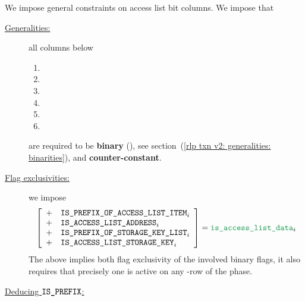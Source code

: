 We impose general constraints on access list bit columns.
We impose that
\begin{description}
    \item[\underline{Generalities:}]
	all columns below
	\begin{multicols}{2}
	    \begin{enumerate}
		\item \rlpTxnSharedColumnIsPrefix
		\item \rlpTxnSharedColumnIsPrefixOfAccessListItem
		\item \rlpTxnSharedColumnIsPrefixOfStorageKeyList
		\item[\vspace{\fill}]
		\item \rlpTxnSharedColumnIsAccessListAddress
		\item \rlpTxnSharedColumnIsAccessListStorageKey
	    \end{enumerate}
	\end{multicols}
	are required to be \textbf{binary} (\sanityCheck),
	see section~(\ref{rlp txn v2: generalities: binarities}),
	and \textbf{counter-constant}.
    \item[\underline{Flag exclusivities:}]
	we impose
	\[
	    \left[ \begin{array}{cl}
		+ & \rlpTxnSharedColumnIsPrefixOfAccessListItem _{i} \\
		+ & \rlpTxnSharedColumnIsAccessListAddress      _{i} \\
		+ & \rlpTxnSharedColumnIsPrefixOfStorageKeyList _{i} \\
		+ & \rlpTxnSharedColumnIsAccessListStorageKey   _{i} \\
	    \end{array} \right]
	    = \locAccessListData _{i}
	\]
	\saNote{}
	The above implies both flag exclusivity of the involved binary flags,
	it also requires that precisely one is active on any \locAccessListData{}-row
	of the \phaseAccessList{} phase.
    \item[\underline{Deducing $\texttt{\texttt{IS\_PREFIX}}$:}]

\end{description}
